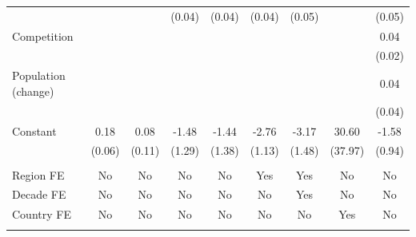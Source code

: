 \documentclass[12pt, letterpaper]{article}
\begin{document}
\begin{landscape}
\begin{table}[htbp]
\begin{small}
\begin{tabular}{l*{8}{c}}
                    &                     &                     &      (0.04)         &      (0.04)         &      (0.04)         &      (0.05)         &                     &      (0.05)         \\
Competition         &                     &                     &                     &                     &                     &                     &                     &        0.04         \\
                    &                     &                     &                     &                     &                     &                     &                     &      (0.02)         \\
Population (change) &                     &                     &                     &                     &                     &                     &                     &        0.04         \\
                    &                     &                     &                     &                     &                     &                     &                     &      (0.04)         \\
Constant            &        0.18\sym{***}&        0.08         &       -1.48         &       -1.44         &       -2.76\sym{**} &       -3.17\sym{**} &       30.60         &       -1.58\sym{*}  \\
                    &      (0.06)         &      (0.11)         &      (1.29)         &      (1.38)         &      (1.13)         &      (1.48)         &     (37.97)         &      (0.94)         \\
\\
Region FE             &         No                &           No              &               No          &      No                    &      Yes               & Yes                     &         No            &      No         \\
Decade FE               &         No                &           No              &               No          &      No                    &      No               & Yes                     &         No            &      No         \\
Country FE                      &         No                &           No              &               No          &      No                    &      No               & No                     &         Yes            &      No         \\
\\                  

\end{tabular}
\end{small}
\end{table}
\end{landscape}
\end{document}
